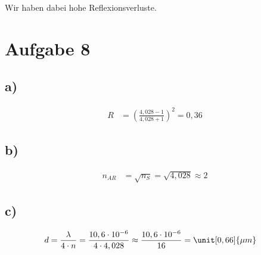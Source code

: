 Wir haben dabei hohe Reflexionsverluste.


\section{Aufgabe 8}

\subsection*{a)}

\begin{align*}
R &= \left( \frac{4,028 - 1}{4,028 + 1} \right)^2 = 0,36
\end{align*}

\subsection*{b)}

\begin{align*}
n_{AR} &= \sqrt{n_S} = \sqrt{4,028} \approx 2
\end{align*}

\subsection*{c)}

\begin{align*}
d &= \frac{\lambda}{4 \cdot n} = \frac{10,6 \cdot 10^{-6}}{4 \cdot 4,028} \approx \frac{10,6 \cdot 10^{-6}}{16} = \unit[0,66]{\mu m}
\end{align*}






